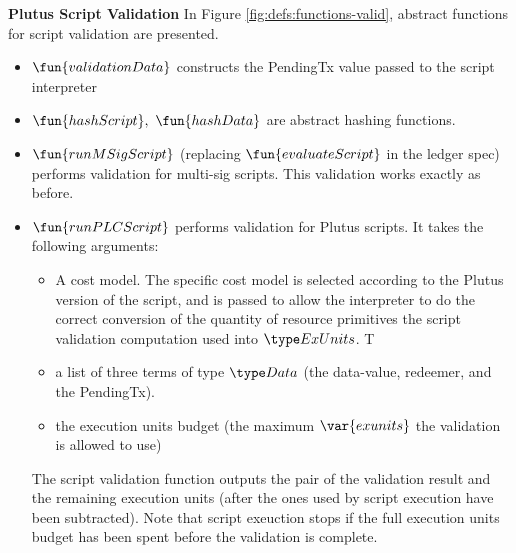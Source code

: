 \textbf{Plutus Script Validation}
In Figure \ref{fig:defs:functions-valid}, abstract functions for script validation
are presented.

\begin{itemize}
  \item $\fun{validationData}$ constructs the PendingTx value passed
  to the script interpreter
  \item $\fun{hashScript},~ \fun{hashData}$ are abstract hashing functions.
  \item $\fun{runMSigScript}$ (replacing $\fun{evaluateScript}$ in the ledger spec) performs
  validation for multi-sig scripts.
  This validation works exactly as before.
  \item $\fun{runPLCScript}$ performs validation for Plutus scripts. It takes the following
  arguments:
  \begin{itemize}
  \item A cost model. The specific cost model is selected according to the Plutus
  version of the script, and is passed to allow the interpreter to do the
  correct conversion of the quantity of resource primitives the script validation
  computation used into $\ExUnits$. T
  \item
  a list of three terms of type $\Data$ (the data-value, redeemer,
  and the PendingTx).
  \item the execution units budget (the maximum $\var{exunits}$
  the validation is allowed to use)
  \end{itemize}
  The script validation function outputs the pair of the validation result
  and the remaining execution units (after the ones used by script execution
  have been subtracted). Note that script exeuction stops if the full execution
  units budget has been spent before the validation is complete.
\end{itemize}


